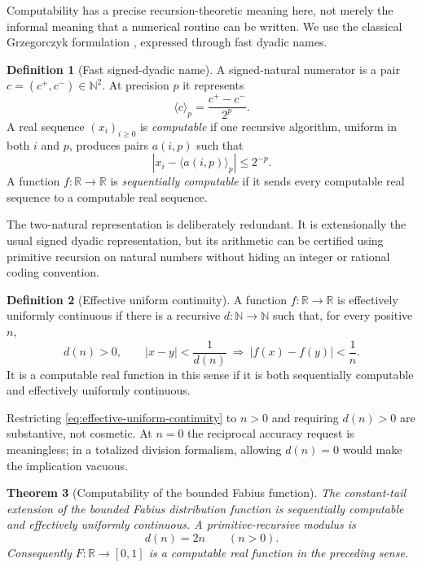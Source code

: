 \documentclass[11pt,oneside]{article}
\newtheorem{theorem}{Theorem}[section]
\theoremstyle{definition}
\newtheorem{definition}[theorem]{Definition}
\theoremstyle{remark}
\newcommand{\R}{\mathbb R}
\newcommand{\N}{\mathbb N}
\begin{document}
Computability has a precise recursion-theoretic meaning here, not merely the informal
meaning that a numerical routine can be written.  We use the classical Grzegorczyk
formulation \cite{grzegorczyk1957}, expressed through fast dyadic names.

\begin{definition}[Fast signed-dyadic name]
A signed-natural numerator is a pair $c=(c^+,c^-)\in\N^2$.  At precision $p$ it represents
\begin{equation}
 \langle c\rangle_p=\frac{c^+-c^-}{2^p}.                 \label{eq:dyadic-name-value}
\end{equation}
A real sequence $(x_i)_{i\ge0}$ is \emph{computable} if one recursive algorithm, uniform
in both $i$ and $p$, produces pairs $a(i,p)$ such that
\begin{equation}
 |x_i-\langle a(i,p)\rangle_p|\le2^{-p}.                 \label{eq:fast-name-error}
\end{equation}
A function $f\colon\R\to\R$ is \emph{sequentially computable} if it sends every
computable real sequence to a computable real sequence.
\end{definition}

The two-natural representation is deliberately redundant.  It is extensionally the usual
signed dyadic representation, but its arithmetic can be certified using primitive recursion
on natural numbers without hiding an integer or rational coding convention.

\begin{definition}[Effective uniform continuity]
A function $f\colon\R\to\R$ is effectively uniformly continuous if there is a recursive
$d\colon\N\to\N$ such that, for every positive $n$,
\begin{equation}
 d(n)>0,\qquad
 |x-y|<\frac1{d(n)}
 \ \Longrightarrow\
 |f(x)-f(y)|<\frac1n.                                    \label{eq:effective-uniform-continuity}
\end{equation}
It is a computable real function in this sense if it is both sequentially computable and
effectively uniformly continuous.
\end{definition}

Restricting \eqref{eq:effective-uniform-continuity} to $n>0$ and requiring $d(n)>0$ are
substantive, not cosmetic.  At $n=0$ the reciprocal accuracy request is meaningless; in a
totalized division formalism, allowing $d(n)=0$ would make the implication vacuous.

\begin{theorem}[Computability of the bounded Fabius function]
\label{thm:fabius-computable}
The constant-tail extension of the bounded Fabius distribution function is sequentially
computable and effectively uniformly continuous.  A primitive-recursive modulus is
\begin{equation}
 d(n)=2n\qquad(n>0).                                      \label{eq:fabius-effective-modulus}
\end{equation}
Consequently $F\colon\R\to[0,1]$ is a computable real function in the preceding sense.
\end{theorem}
\end{document}
